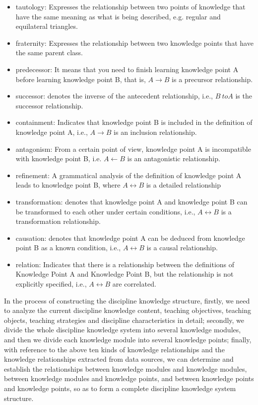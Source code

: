 \begin{itemize}
	\item tautology: Expresses the relationship between two points of knowledge that have the same meaning as what is being described, e.g. regular and equilateral triangles.
	\item fraternity: Expresses the relationship between two knowledge points that have the same parent class.
	\item predecessor: It means that you need to finish learning knowledge point A before learning knowledge point B, that is, \(A\to B\) is a precursor relationship.
	\item successor: denotes the inverse of the antecedent relationship, i.e., \(B\ to A\) is the successor relationship.
	\item containment: Indicates that knowledge point B is included in the definition of knowledge point A, i.e., \(A\to B\) is an inclusion relationship.
	\item antagonism: From a certain point of view, knowledge point A is incompatible with knowledge point B, i.e. \(A\leftarrow B\) is an antagonistic relationship.
	\item refinement: A grammatical analysis of the definition of knowledge point A leads to knowledge point B, where \(A\leftrightarrow B\) is a detailed relationship
	\item transformation: denotes that knowledge point A and knowledge point B can be transformed to each other under certain conditions, i.e., \(A\leftrightarrow B\) is a transformation relationship.
	\item causation: denotes that knowledge point A can be deduced from knowledge point B as a known condition, i.e., \(A\leftrightarrow B\) is a causal relationship.
	\item relation: Indicates that there is a relationship between the definitions of Knowledge Point A and Knowledge Point B, but the relationship is not explicitly specified, i.e., \(A\leftrightarrow B\) are correlated.
\end{itemize}

In the process of constructing the discipline knowledge structure, firstly, we need to analyze the current discipline knowledge content, teaching objectives, teaching objects, teaching strategies and discipline characteristics in detail; secondly, we divide the whole discipline knowledge system into several knowledge modules, and then we divide each knowledge module into several knowledge points; finally, with reference to the above ten kinds of knowledge relationships and the knowledge relationships extracted from data sources, we can determine and establish the relationships between knowledge modules and knowledge modules, between knowledge modules and knowledge points, and between knowledge points and knowledge points, so as to form a complete discipline knowledge system structure.

